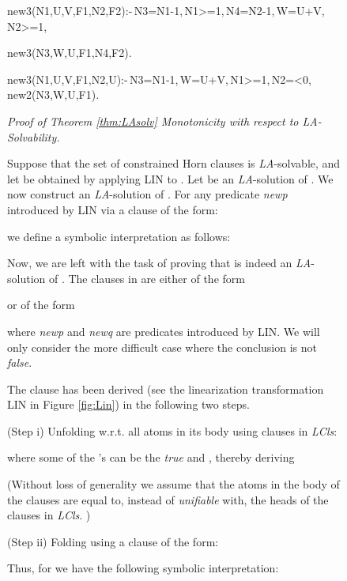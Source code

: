 \documentclass[english]{tlp}
\begin{document}
\begin{figure}[ht]
\begin{flushleft}
\begin{minipage}{124mm}
{{{\noindent
new3(N1,U,V,F1,N2,F2):-\,N3=N1-1,\,N1>=1,\,N4=N2-1,\,W=U+V,\,N2>=1,\par\hspace{12mm} 
             new3(N3,W,U,F1,N4,F2).
             
\noindent
new3(N1,U,V,F1,N2,U):-\,N3=N1-1,\,W=U+V,\,N1>=1,\,N2=<0,\,new2(N3,W,U,F1).


}}} \normalsize

\medskip

\noindent
{\it Proof of Theorem \ref{thm:LAsolv} Monotonicity with respect to {\it LA}-Solvability.}

\noindent
Suppose that the set  of constrained Horn clauses
is {\it LA}-solvable, and let  be obtained by applying
LIN to . 
Let  be an {\it LA}-solution of . We now construct an {\it LA}-solution of .
For any predicate {\it newp} introduced by LIN via a clause of the form:



\noindent
we define a symbolic interpretation  as follows:



\noindent
Now, we are left with the task of proving that  is indeed an
{\it LA}-solution of .
The clauses in  are either of the form



\noindent
or of the form



\noindent
where \textit{newp} and \textit{newq} are
 predicates  introduced by LIN. We will only consider the more difficult case where
the conclusion is not \textit{false}.

The clause 
has been derived (see the {\rm linearization} transformation LIN in Figure \ref{fig:Lin})
in the following two steps.

\noindent
(Step i) Unfolding  
w.r.t. all atoms in its body using  clauses in \textit{LCls}:



\noindent
where some of the 's can be the \textit{true} and , thereby deriving



\noindent
(Without loss of generality we assume that the atoms in the body
of the clauses are equal to, instead of {\it unifiable} with,
the heads of the clauses in \textit{LCls}. )

\noindent
(Step ii) Folding 
using a clause of the form:



\noindent
Thus, for  we have the following symbolic interpretation:




\end{minipage}
\end{flushleft}
\end{figure}
\end{document}
